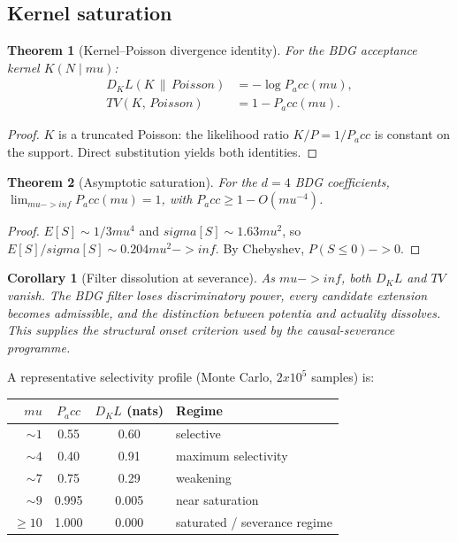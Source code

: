 \documentclass[11pt]{article}
\def\sigma{sigma}%
\def\mu{mu}%
\def\mathrm#1{#1}%
\def\mathbf#1{#1}%
\def\mathbb#1{#1}%
\def\frac#1#2{#1/#2}%
\def\times{x}%
\def\to{->}%
\def\infty{inf}%
\def\Pacc{P_acc}%
\def\Dkl{D_KL}%
\def\TV{TV}%
\newtheorem{theorem}{Theorem}
\newtheorem{corollary}{Corollary}
\newcommand{\Pacc}{\ensuremath{P_{\mathrm{acc}}}}
\newcommand{\Dkl}{\ensuremath{D_{\mathrm{KL}}}}
\newcommand{\TV}{\ensuremath{\mathrm{TV}}}
\begin{document}
\subsection{Kernel saturation}

\begin{theorem}[Kernel--Poisson divergence identity]
\label{thm:kl}
For the BDG acceptance kernel $K(\mathbf{N}\mid \mu)$:
\begin{align}
\Dkl(K\,\|\,\mathrm{Poisson}) &= -\log\Pacc(\mu), \\
\TV(K,\,\mathrm{Poisson}) &= 1-\Pacc(\mu).
\end{align}
\end{theorem}
\begin{proof}
$K$ is a truncated Poisson: the likelihood ratio $K/P=1/\Pacc$ is constant on the support. Direct substitution yields both identities.
\end{proof}

\begin{theorem}[Asymptotic saturation]
\label{thm:saturation}
For the $d=4$ BDG coefficients, $\lim_{\mu\to\infty}\Pacc(\mu)=1$, with $\Pacc\ge 1-O(\mu^{-4})$.
\end{theorem}
\begin{proof}
$\mathbb{E}[S]\sim\frac{1}{3}\mu^4$ and $\sigma[S]\sim 1.63\mu^2$, so $\mathbb{E}[S]/\sigma[S]\sim 0.204\mu^2\to\infty$. By Chebyshev, $\mathbb{P}(S\le 0)\to 0$.
\end{proof}

\begin{corollary}[Filter dissolution at severance]
As $\mu\to\infty$, both $\Dkl$ and $\TV$ vanish. The BDG filter loses discriminatory power, every candidate extension becomes admissible, and the distinction between potentia and actuality dissolves. This supplies the structural onset criterion used by the causal-severance programme.
\end{corollary}

A representative selectivity profile (Monte Carlo, $2\times 10^5$ samples) is:

\begin{center}
\begin{tabular}{rccl}
\toprule
$\mu$ & $\Pacc$ & $\Dkl$ (nats) & Regime \\
\midrule
$\sim 1$ & 0.55 & 0.60 & selective \\
$\sim 4$ & 0.40 & 0.91 & maximum selectivity \\
$\sim 7$ & 0.75 & 0.29 & weakening \\
$\sim 9$ & 0.995 & 0.005 & near saturation \\
$\ge 10$ & 1.000 & 0.000 & saturated / severance regime \\
\bottomrule
\end{tabular}
\end{center}
\end{document}
